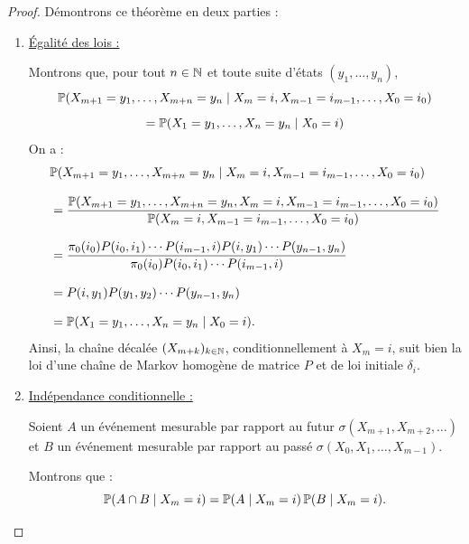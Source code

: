 \begin{proof}
    Démontrons ce théorème en deux parties : 

    \begin{enumerate}
        \item \underline{Égalité des lois :} 

        Montrons que, pour tout $n \in \mathbb{N}$ et toute suite d’états $(y_1, \dots, y_n)$,
        \[ \mathbb{P}(X_{m+1} = y_1, \dots, X_{m+n} = y_n \mid X_m = i, X_{m-1} = i_{m-1}, \dots, X_0 = i_0) \]
        \[ = \mathbb{P}(X_1 = y_1, \dots, X_n = y_n \mid X_0 = i) \] 
        On a :
        \begin{align*}
            &\mathbb{P}(X_{m+1} = y_1, \dots, X_{m+n} = y_n \mid X_m = i, X_{m-1} = i_{m-1}, \dots, X_0 = i_0) \\[0.8em]
            &= \frac{
                \mathbb{P}(X_{m+1} = y_1, \dots, X_{m+n} = y_n, X_m = i, X_{m-1} = i_{m-1}, \dots, X_0 = i_0)
            }{
                \mathbb{P}(X_m = i, X_{m-1} = i_{m-1}, \dots, X_0 = i_0)
            } \\[0.8em]
            &= \frac{
                \pi_0(i_0) P(i_0, i_1) \cdots P(i_{m-1}, i)
                P(i, y_1) \cdots P(y_{n-1}, y_n)
            }{
                \pi_0(i_0) P(i_0, i_1) \cdots P(i_{m-1}, i)
            } \\[0.8em]
            &= P(i, y_1) P(y_1, y_2) \cdots P(y_{n-1}, y_n) \\[0.8em]
            &= \mathbb{P}(X_1 = y_1, \dots, X_n = y_n \mid X_0 = i).
        \end{align*}
        Ainsi, la chaîne décalée $(X_{m+k})_{k \in \mathbb{N}}$, conditionnellement à $X_m = i$, 
        suit bien la loi d’une chaîne de Markov homogène de matrice $P$ et de loi initiale $\delta_i$.

        \vspace{1em}

        \item \underline{Indépendance conditionnelle :}

        Soient $A$ un événement mesurable par rapport au futur $\sigma(X_{m+1}, X_{m+2}, \dots)$ 
        et $B$ un événement mesurable par rapport au passé $\sigma(X_0, X_1, \dots, X_{m-1})$.

        Montrons que :
        \[
            \mathbb{P}(A \cap B \mid X_m = i)
            = \mathbb{P}(A \mid X_m = i)\,\mathbb{P}(B \mid X_m = i).
        \]


\end{enumerate}
\end{proof}
